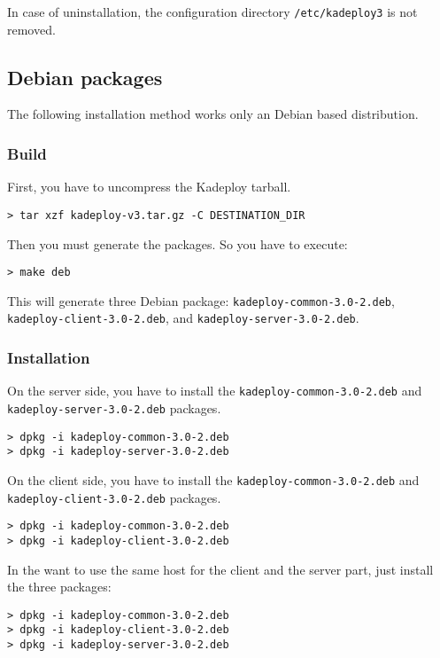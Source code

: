 \documentclass[a4wide,10pt,oneside]{book}
\begin{document}
\noindent In case of uninstallation, the configuration directory \texttt{/etc/kadeploy3} is not removed.

\subsection{Debian packages}
The following installation method works only an Debian based distribution.
\subsubsection{Build}
\noindent First, you have to uncompress the Kadeploy tarball. 
\begin{small}
\begin{verbatim}
> tar xzf kadeploy-v3.tar.gz -C DESTINATION_DIR
\end{verbatim}
\end{small}

\noindent Then you must generate the packages. So you have to execute:
\begin{small}
\begin{verbatim}
> make deb
\end{verbatim}
\end{small}
This will generate three Debian package: \texttt{kadeploy-common-3.0-2.deb}, \texttt{kadeploy-client-3.0-2.deb}, and \texttt{kadeploy-server-3.0-2.deb}.
\subsubsection{Installation}
\noindent On the server side, you have to install the \texttt{kadeploy-common-3.0-2.deb} and \texttt{kadeploy-server-3.0-2.deb} packages.
\begin{small}
\begin{verbatim}
> dpkg -i kadeploy-common-3.0-2.deb
> dpkg -i kadeploy-server-3.0-2.deb
\end{verbatim}
\end{small}

\noindent On the client side, you have to install the \texttt{kadeploy-common-3.0-2.deb} and \texttt{kadeploy-client-3.0-2.deb} packages.
\begin{small}
\begin{verbatim}
> dpkg -i kadeploy-common-3.0-2.deb
> dpkg -i kadeploy-client-3.0-2.deb
\end{verbatim}
\end{small}

\noindent In the want to use the same host for the client and the server part, just install the three packages:
\begin{small}
\begin{verbatim}
> dpkg -i kadeploy-common-3.0-2.deb
> dpkg -i kadeploy-client-3.0-2.deb
> dpkg -i kadeploy-server-3.0-2.deb
\end{verbatim}
\end{small}
\end{document}
